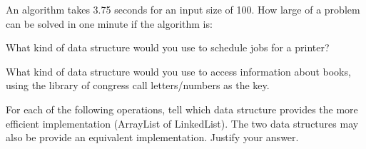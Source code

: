 \documentclass[11pt,letter]{exam}
\begin{document}
\begin{questions}

\question
An algorithm takes 3.75 seconds for an input size of 100.  How large of a
problem can be solved in one minute if the algorithm is:


\question[5] What kind of data structure would you use to schedule
jobs for a printer?


\question[5] What kind of data structure would you use to access
information about books, using the library of congress call
letters/numbers as the key. 

\question  For each of the following operations, tell which data
structure provides the more efficient implementation (ArrayList of
LinkedList).  The two data structures may also be provide an
equivalent implementation.  Justify your answer.
\begin{parts}

\end{parts}
\end{questions}
\end{document}
